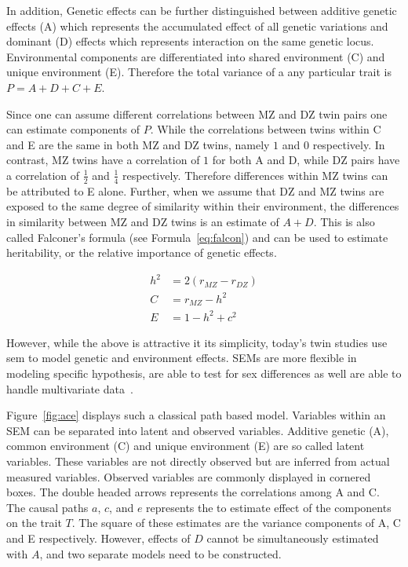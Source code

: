 \documentclass[../header.tex]{subfiles}
\begin{document}
In addition, Genetic effects can be further distinguished between additive genetic effects (A) which represents the accumulated effect of all genetic variations and dominant (D) effects which represents interaction on the same genetic locus.
Environmental components are differentiated into shared environment (C) and unique environment (E).
Therefore the total variance of a any particular trait is $P = A+D+C+E$.

Since one can assume different correlations between MZ and DZ twin pairs one can estimate components of $P$.
While the correlations between twins within C and E are the same in both MZ and DZ twins, namely $1$ and $0$ respectively.
In contrast, MZ twins have a correlation of $1$ for both A and D, while DZ pairs have a correlation of $\frac{1}{2}$ and $\frac{1}{4}$ respectively.
Therefore differences within MZ twins can be attributed to E alone.
Further, when we assume that DZ and MZ twins are exposed to the same degree of similarity within their environment, the differences in similarity between MZ and DZ twins is an estimate of $A+D$.
This is also called Falconer's formula (see Formula~\ref{eq:falcon}) and can be used to estimate heritability, or the relative importance of genetic effects.

\begin{align}
  h^2 &= 2(r_{MZ}-r_{DZ})\label{eq:falcon} \\ 
  C &= r_{MZ} - h^2  \\
  E &= 1 - h^2 + c^2  
\end{align}

However, while the above is attractive it its simplicity, today's twin studies use \acrfull{sem} to model genetic and environment effects.
SEMs are more flexible in modeling specific hypothesis, are able to test for sex differences as well are able to handle multivariate data~\cite{Rijsdijk2002}.

Figure~\ref{fig:ace} displays such a classical path based model.
Variables within an SEM can be separated into latent and observed variables.
Additive genetic (A), common environment (C) and unique environment (E) are so called latent variables.
These variables are not directly observed but are inferred from actual measured variables.
Observed variables are commonly displayed in cornered boxes.
The double headed arrows represents the correlations among A and C.
The causal paths $a$, $c$, and $e$ represents the to estimate effect of the components on the trait $T$.
The square of these estimates are the variance components of A, C and E respectively.
However, effects of $D$ cannot be simultaneously estimated with $A$, and two separate models need to be constructed.
\end{document}
